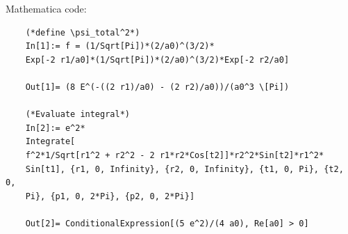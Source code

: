 \documentclass{article}
\theoremstyle{definition}
\begin{document}
\begin{enumerate}[label=(\alph*)]
	
	
	
	
	
	
	
	
	Mathematica code:
	\begin{lstlisting}
	(*define \psi_total^2*)
	In[1]:= f = (1/Sqrt[Pi])*(2/a0)^(3/2)*
	Exp[-2 r1/a0]*(1/Sqrt[Pi])*(2/a0)^(3/2)*Exp[-2 r2/a0]
	
	Out[1]= (8 E^(-((2 r1)/a0) - (2 r2)/a0))/(a0^3 \[Pi])
	
	(*Evaluate integral*)
	In[2]:= e^2*
	Integrate[
	f^2*1/Sqrt[r1^2 + r2^2 - 2 r1*r2*Cos[t2]]*r2^2*Sin[t2]*r1^2*
	Sin[t1], {r1, 0, Infinity}, {r2, 0, Infinity}, {t1, 0, Pi}, {t2, 0,
	Pi}, {p1, 0, 2*Pi}, {p2, 0, 2*Pi}]
	
	Out[2]= ConditionalExpression[(5 e^2)/(4 a0), Re[a0] > 0]
	\end{lstlisting}
	
	
	
	
	

\end{enumerate}
\end{document}
